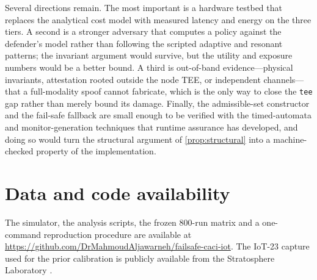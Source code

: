 Several directions remain. The most important is a hardware testbed that replaces
the analytical cost model with measured latency and energy on the three tiers. A
second is a stronger adversary that computes a policy against the defender's model
rather than following the scripted adaptive and resonant patterns; the invariant
argument would survive, but the utility and exposure numbers would be a better
bound. A third is out-of-band evidence---physical invariants, attestation rooted
outside the node TEE, or independent channels---that a full-modality spoof cannot
fabricate, which is the only way to close the \texttt{tee} gap rather than merely
bound its damage. Finally, the admissible-set constructor and the fail-safe
fallback are small enough to be verified with the timed-automata and
monitor-generation techniques that runtime assurance has developed, and doing so
would turn the structural argument of \cref{prop:structural} into a machine-checked
property of the implementation.

\section*{Data and code availability}

The simulator, the analysis scripts, the frozen $800$-run matrix and a
one-command reproduction procedure are available at
\url{https://github.com/DrMahmoudAljawarneh/failsafe-caci-iot}. The IoT-23 capture
used for the prior calibration is publicly available from the Stratosphere
Laboratory \cite{garcia2020iot}.
